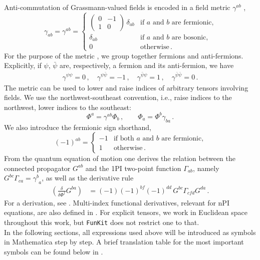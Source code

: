 \documentclass[preprint,10pt,sort&compress]{elsarticle}
\newcommand{\FunKit}{\texttt{FunKit}\xspace}
\begin{document}
Anti-commutation of Grassmann-valued fields is encoded in a field metric $\gamma^{ab}$ \cite{Pawlowski:2005xe, Braun:2025gvq},
%
\begin{equation}\label{eq:metric}
	\gamma_{ab} = \gamma^{ab} = \begin{cases}
		\begin{pmatrix}
			0 & -1 \\
			1 & 0
		\end{pmatrix}\,\delta_{ab}
		& \text{if $a$ and $b$ are fermionic,} \\[3ex]
		\delta_{ab} & \text{if $a$ and $b$ are bosonic,}   \\[2ex]
		0               & \text{otherwise}
		\,.
	\end{cases}
\end{equation}
%
For the purpose of the metric , we group together fermions and anti-fermions. Explicitly, if $\psi$, $\bar{\psi}$ are, respectively, a fermion and its anti-fermion, we have
%
\begin{align}
	\gamma^{\psi\psi} = 0\,,\quad
	\gamma^{\psi\bar\psi}=-1\,,\quad
	\gamma^{\bar\psi\psi}=1\,,\quad
	\gamma^{\bar\psi\bar\psi} = 0\,.
\end{align}
%
The metric can be used to lower and raise indices of arbitrary tensors involving fields. We use the northwest-southeast convention, i.e., raise indices to the northwest, lower indices to the southeast:
%
\begin{equation}
	\Phi^a = \gamma^{ab}\Phi_b \,,
	\quad \quad
	\Phi_a = \Phi^b\gamma_{ba} \,.
\end{equation}
%
We also introduce the fermionic sign shorthand,
%
\begin{equation}
	(-1)^{ab} = \begin{cases}
		-1 & \text{if both $a$ and $b$ are fermionic,} \\[1ex]
		1 & \text{otherwise}
		\,.
	\end{cases}
	\label{eq:fminus}
\end{equation}
%
From the quantum equation of motion one derives the relation between the connected propagator $G^{ab}$ and the 1PI two-point function $\Gamma_{ab}$, namely $G^{bc}\Gamma_{ca} = \gamma^b_{\phantom{b}a}$, as well as the derivative rule
%
\begin{align}\label{eq:derivG}
	\left(\frac{\delta}{\delta \Phi^f}G^{ba}\right)
	&= (-1)(-1)^{bf}(-1)^{dd}\, G^{bc}\Gamma_{cfd}G^{da}\,.
\end{align}
%
For a derivation, see . Multi-index functional derivatives, relevant for nPI equations, are also defined in .
For explicit tensors, we work in Euclidean space throughout this work, but \FunKit does not restrict one to that.\\
In the following sections, all expressions used above will be introduced as symbols in Mathematica step by step. A brief translation table for the most important symbols can be found below in .
\end{document}
